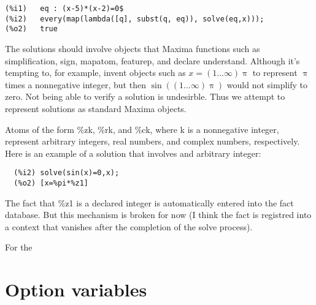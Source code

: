 \documentclass[]{article}%
\begin{document}
\begin{verbatim}
(%i1)	eq : (x-5)*(x-2)=0$
(%i2)	every(map(lambda([q], subst(q, eq)), solve(eq,x)));
(%o2)	true
\end{verbatim}

The solutions should involve objects that Maxima functions such as simplification, sign, mapatom, featurep,
and declare understand. Although it's tempting to, for example, invent objects such as
\(x = (1 ... \infty) \uppi\) to represent \(\uppi\) times a nonnegative integer, but then
\(\sin \left ((1 ... \infty) \uppi \right) \) would not simplify to zero. Not being able to verify a
solution is undesirble. Thus we attempt to represent solutions as standard Maxima objects.

Atoms of the form \%zk, \%rk, and \%ck, where k is a nonnegative integer, represent arbitrary integers, real numbers, and complex numbers, respectively. Here is an example of a solution that involves and arbitrary integer:
\begin{verbatim}
  (%i2)	solve(sin(x)=0,x);
  (%o2)	[x=%pi*%z1]
\end{verbatim}
The fact that \%z1 is a declared integer is automatically entered into the fact database. But this mechanism is broken for now (I think the fact is registred into a context that vanishes after the completion of the solve process).

For the


\section{Option variables}
\end{document}
